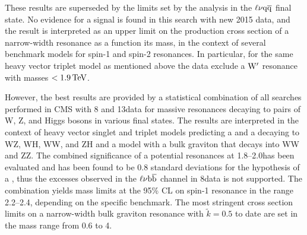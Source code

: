 These results are superseded by the limits set by the analysis in the $\ell\nu\mathrm{q}\overline{\mathrm{q}}$ final state.
No evidence for a signal is found in this search with new 2015 data, and the result is interpreted as an upper limit on the production cross section of a narrow-width resonance as a function its mass,
in the context of several benchmark models for spin-1 and spin-2 resonances. In particular, for the same heavy vector triplet model as mentioned above the data exclude a $\mathrm{W}^\prime$ resonance with masses $< 1.9\,\text{Te\hspace{-.08em}V}$.

However, the best results are provided by a statistical combination of all searches performed in CMS with 8 and 13\TeV data for massive resonances decaying to pairs of W, Z, and Higgs bosons in various final states.
The results are interpreted in the context of heavy vector singlet and triplet models predicting a \Wpr and a \Zpr decaying to WZ, WH, WW, and ZH and a model with a bulk graviton that decays into WW and ZZ.
The combined significance of a potential resonances at 1.8--2.0\TeV has been evaluated and has been found to be 0.8 standard deviations for the hypothesis of a \Wpr,
thus the excesses observed in the $\ell\nu{\mathrm{b}\overline{\mathrm{b}}}$ channel in 8\TeV data is not supported.
The combination yields mass limits at the 95\% CL on spin-1 resonance in the range 2.2--2.4\TeV, depending on the specific benchmark.
The most stringent cross section limits on a narrow-width bulk graviton resonance with $\tilde{k} = 0.5$ to date are set in the mass range from 0.6 to 4\TeV.
